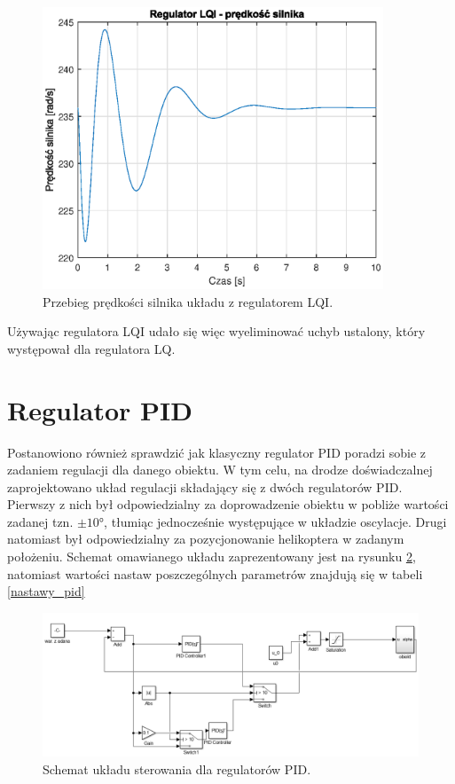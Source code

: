 \documentclass[11pt,a4paper]{article}
\begin{document}
\begin{figure}[H]
	\centering
	\includegraphics[width=4in]{Figures/LQI_model_obs_03_w_v.eps}
	\caption{Przebieg prędkości silnika układu z regulatorem LQI.}
	\label{fig:LQI_model_obs_03_w_v}
\end{figure}

Używając regulatora LQI udało się więc wyeliminować uchyb ustalony, który występował dla regulatora LQ.

\section{Regulator PID}
Postanowiono również sprawdzić jak klasyczny regulator PID poradzi sobie z zadaniem regulacji dla danego obiektu. W tym celu, na drodze doświadczalnej zaprojektowano układ regulacji składający się z dwóch regulatorów PID. Pierwszy z nich był odpowiedzialny za doprowadzenie obiektu w pobliże wartości zadanej tzn. \(\pm\ang{10}\), tłumiąc jednocześnie występujące w układzie oscylacje. Drugi natomiast był odpowiedzialny za pozycjonowanie helikoptera w zadanym położeniu. Schemat omawianego układu zaprezentowany jest na rysunku \ref{fig:pid_schemat}, natomiast wartości nastaw poszczególnych parametrów znajdują się w tabeli \ref{nastawy_pid} 

\begin{figure}[H]
	\centering
	\includegraphics[width=5.9in]{Figures/PID_schemat.png}
	\caption{Schemat układu sterowania dla regulatorów PID.}
	\label{fig:pid_schemat}
\end{figure}
\end{document}

